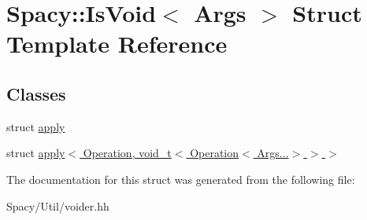 \hypertarget{structSpacy_1_1IsVoid}{}\section{Spacy\+:\+:Is\+Void$<$ Args $>$ Struct Template Reference}
\label{structSpacy_1_1IsVoid}
\subsection*{Classes}
\begin{DoxyCompactItemize}
\item 
struct \hyperlink{structSpacy_1_1IsVoid_1_1apply}{apply}
\item 
struct \hyperlink{structSpacy_1_1IsVoid_1_1apply_3_01Operation_00_01void__t_3_01Operation_3_01Args_8_8_8_4_01_4_01_4}{apply$<$ Operation, void\+\_\+t$<$ Operation$<$ Args...$>$ $>$ $>$}
\end{DoxyCompactItemize}


The documentation for this struct was generated from the following file\+:\begin{DoxyCompactItemize}
\item 
Spacy/\+Util/voider.\+hh\end{DoxyCompactItemize}
